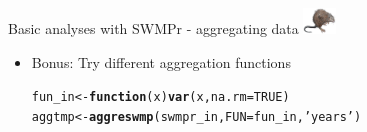 \documentclass[xcolor=dvipsnames,serif]{beamer}\usepackage[]{graphicx}\usepackage[]{color}
\makeatletter
\newcommand{\hlnum}[1]{\textcolor[rgb]{0.686,0.059,0.569}{#1}}%
\newcommand{\hlstr}[1]{\textcolor[rgb]{0.192,0.494,0.8}{#1}}%
\newcommand{\hlstd}[1]{\textcolor[rgb]{0.345,0.345,0.345}{#1}}%
\newcommand{\hlkwa}[1]{\textcolor[rgb]{0.161,0.373,0.58}{\textbf{#1}}}%
\newcommand{\hlkwb}[1]{\textcolor[rgb]{0.69,0.353,0.396}{#1}}%
\newcommand{\hlkwc}[1]{\textcolor[rgb]{0.333,0.667,0.333}{#1}}%
\newcommand{\hlkwd}[1]{\textcolor[rgb]{0.737,0.353,0.396}{\textbf{#1}}}%
\newenvironment{kframe}{%
 \def\at@end@of@kframe{}%
 \ifinner\ifhmode%
  \def\at@end@of@kframe{\end{minipage}}%
  \begin{minipage}{\columnwidth}%
 \fi\fi%
 \def\FrameCommand##1{\hskip\@totalleftmargin \hskip-\fboxsep
 \colorbox{shadecolor}{##1}\hskip-\fboxsep
     \hskip-\linewidth \hskip-\@totalleftmargin \hskip\columnwidth}%
 \MakeFramed {\advance\hsize-\width
   \@totalleftmargin\z@ \linewidth\hsize
   \@setminipage}}%
 {\par\unskip\endMakeFramed%
 \at@end@of@kframe}
\newenvironment{knitrout}{}{} %
\makeatother
\begin{document}
\begin{frame}[fragile,t]{Basic analyses with SWMPr - aggregating data \includegraphics[width = 0.065\textwidth]{imgs/swmprat.png}}
\begin{itemize}
\begin{knitrout}
\begin{kframe}
\end{kframe}
\end{knitrout}
\vspace{0.1in}
\item
{}
Bonus: Try different aggregation functions
\begin{knitrout}\scriptsize
{}\color{fgcolor}\begin{kframe}
\begin{alltt}
\hlstd{fun_in} \hlkwb{<-} \hlkwa{function}\hlstd{(}\hlkwc{x}\hlstd{)}  \hlkwd{var}\hlstd{(x,} \hlkwc{na.rm} \hlstd{=} \hlnum{TRUE}\hlstd{)}
\hlstd{aggtmp} \hlkwb{<-} \hlkwd{aggreswmp}\hlstd{(swmpr_in,} \hlkwc{FUN} \hlstd{= fun_in,} \hlstr{'years'}\hlstd{)}
\end{alltt}
\end{kframe}
\end{knitrout}
\vspace{0.1in}
\end{itemize}
\end{frame}
\end{document}
